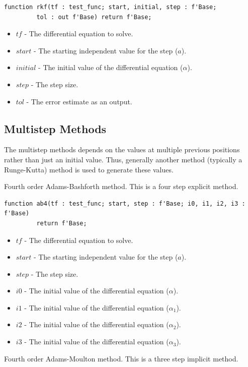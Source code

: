 \documentclass[10pt, openany]{book}
\newcommand{\indexfunc}[1]{\index[func]{#1}}
\begin{document}
\begin{lstlisting}
function rkf(tf : test_func; start, initial, step : f'Base;
         tol : out f'Base) return f'Base;
\end{lstlisting}
\indexfunc{ode-rkf}
\begin{itemize}
  \item $tf$ - The differential equation to solve.
  \item $start$ - The starting independent value for the step ($a$).
  \item $initial$ - The initial value of the differential equation ($\alpha$).
  \item $step$ - The step size.
  \item $tol$ - The error estimate as an output.
\end{itemize}

\subsection{Multistep Methods}
The multistep methods depends on the values at multiple previous positions rather than just an initial value.  Thus, generally another method (typically a Runge-Kutta) method is used to generate these values.

Fourth order Adams-Bashforth method.  This is a four step explicit method.

\begin{lstlisting}
function ab4(tf : test_func; start, step : f'Base; i0, i1, i2, i3 : f'Base)
         return f'Base;
\end{lstlisting}
\indexfunc{ode-ab4}
\begin{itemize}
  \item $tf$ - The differential equation to solve.
  \item $start$ - The starting independent value for the step ($a$).
  \item $step$ - The step size.
  \item $i0$ - The initial value of the differential equation ($\alpha$).
  \item $i1$ - The initial value of the differential equation ($\alpha_1$).
  \item $i2$ - The initial value of the differential equation ($\alpha_2$).
  \item $i3$ - The initial value of the differential equation ($\alpha_3$).
\end{itemize}

Fourth order Adams-Moulton method.  This is a three step implicit method.
\end{document}
